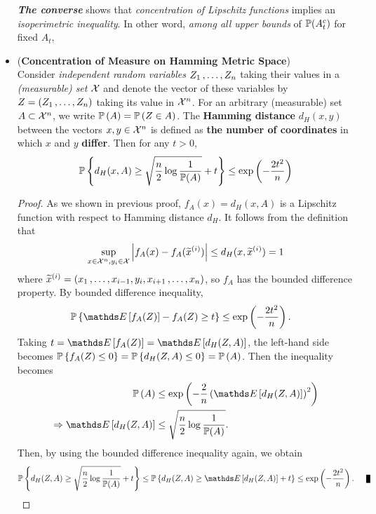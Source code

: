 \documentclass[11pt]{article}
\begin{document}
\begin{itemize}
\begin{remark}
\emph{\textbf{The converse}} shows that \emph{concentration of Lipschitz functions} implies an \emph{isoperimetric inequality}. In other word, \emph{among all upper bounds} of ${\mathbb P}(A_t^c)$ for fixed $A_t$, 
\end{remark}

\item \begin{corollary} (\textbf{Concentration of  Measure on Hamming Metric Space}) \citep{boucheron2013concentration}\\
Consider \emph{independent random variables} $Z_1 \,{,}\ldots{,}\, Z_n$ taking their values in a \emph{(measurable) set} ${\mathcal X}$ and denote the vector of these variables by $Z = (Z_1 \,{,}\ldots{,}\, Z_n)$ taking its value in ${\mathcal X}^n$.  For an arbitrary (measurable) set $A \subset {\mathcal X}^n$, we write ${\mathbb P}\left(A\right) = {\mathbb P}\left(Z \in A\right)$.  The \textbf{Hamming distance} $d_{H}(x, y)$ between the vectors $x, y \in {\mathcal X}^n$ is defined as \textbf{the number of coordinates} in which $x$ and $y$ \textbf{differ}. Then for any $t >0$, 
\begin{align}
{\mathbb P}\left\{d_{H}(x, A) \ge \sqrt{\frac{n}{2}\log \frac{1}{{\mathbb P}(A)}} + t\right\} \le \exp\left(-\frac{2t^2}{n}\right)  \label{ineqn: isoperimetry_inequality_hamming_distance}
\end{align}
\end{corollary}
\begin{proof}
As we shown in previous proof, $f_A(x) = d_{H}(x, A)$ is a Lipschitz function with respect to Hamming distance $d_H$. It follows from the definition that 
\begin{align*}
\sup_{x \in {\mathcal X}^n, y_i \in {\mathcal X}}\left\lvert f_{A}(x) - f_{A}(\widetilde{x}^{(i)}) \right\rvert \le d_{H}(x, \widetilde{x}^{(i)}) = 1
\end{align*} where $\widetilde{x}^{(i)} = (x_1 \,{,}\ldots{,}\, x_{i-1}, y_i, x_{i+1} \,{,}\ldots{,}\, x_{n})$, so $f_A$ has the bounded difference property. By bounded difference inequality, 
\begin{align*}
\bP\set{ \E{}{f_{A}(Z)} - f_{A}(Z)  \ge t }  &\le \exp\paren{-\frac{2t^2}{n}}.
\end{align*} Taking $t = \E{}{f_{A}(Z)} = \E{}{d_{H}(Z, A)}$, the left-hand side becomes ${\mathbb P}\left\{f_{A}(Z) \le 0\right\} = {\mathbb P}\left\{d_{H}(Z, A)  \le 0\right\}  = {\mathbb P}\left(A\right)$. Then the inequality becomes
\begin{align*}
\bP\paren{A} &\le \exp\paren{- \frac{2}{n} \paren{\E{}{d_{H}(Z, A)}}^2} \\
\Rightarrow \E{}{d_{H}(Z, A)} &\le \sqrt{\frac{n}{2}\log \frac{1}{\bP(A)}}.
\end{align*} Then, by using the bounded difference inequality again, we obtain
\begin{align*}
\bP\set{d_H(Z, A) \ge  \sqrt{\frac{n}{2}\log \frac{1}{\bP(A)}} + t } \le \bP\set{d_H(Z, A) \ge  \E{}{d_{H}(Z, A)} + t } \le \exp\paren{-\frac{2t^2}{n}}. \qed
\end{align*}
\end{proof}


\end{itemize}
\end{document}
